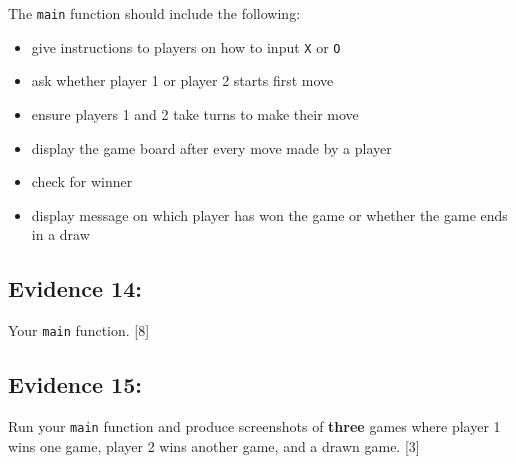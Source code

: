 The \texttt{main} function should include the following: 
\begin{itemize}
\item give instructions to players on how to input \texttt{X} or \texttt{O} 
\item ask whether player 1 or player 2 starts first move 
\item ensure players 1 and 2 take turns to make their move 
\item display the game board after every move made by a player
\item check for winner
\item display message on which player has won the game or whether the game
ends in a draw
\end{itemize}

\subsection*{Evidence 14: }

Your \texttt{main} function. \hfill{} {[}8{]}

\subsection*{Evidence 15: }

Run your \texttt{main} function and produce screenshots of \textbf{three}
games where player 1 wins one game, player 2 wins another game, and
a drawn game. \hfill{}{[}3{]}